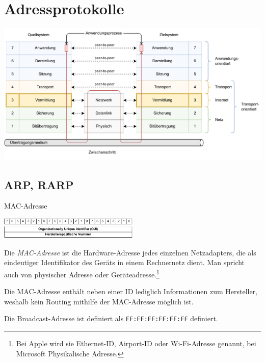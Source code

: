 \section{Adressprotokolle}

\includegraphics[width=\textwidth]{includes/figures/defi_iso_osi_vermittlung.pdf}

\subsection{ARP, RARP}

\begin{defi}{MAC-Adresse}
    \begin{center}
        \includegraphics[width=0.5\textwidth]{includes/figures/defi_mac.pdf}
    \end{center}

    Die \emph{MAC-Adresse} ist die Hardware-Adresse jedes einzelnen Netzadapters, die als eindeutiger Identifikator des Geräts in einem Rechnernetz dient.
    Man spricht auch von physischer Adresse oder Geräteadresse.\footnote{Bei Apple wird sie Ethernet-ID, Airport-ID oder Wi-Fi-Adresse genannt, bei Microsoft Physikalische Adresse.}

    Die MAC-Adresse enthält neben einer ID lediglich Informationen zum Hersteller, weshalb kein Routing mithilfe der MAC-Adresse möglich ist.

    Die Broadcast-Adresse ist definiert als \texttt{FF:FF:FF:FF:FF:FF} definiert.

\end{defi}

